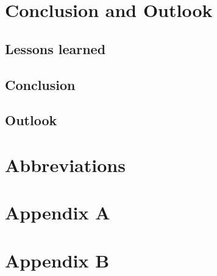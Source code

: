 \chapter{Conclusion and Outlook}\label{conclusion_outlook}
\section{Lessons learned}\label{lessons_learned}

\section{Conclusion}\label{conclusion}

\section{Outlook}\label{outlook}

\chapter{Abbreviations}

\printbibliography

\chapter{Appendix A}\label{appendix a}

\chapter{Appendix B}\label{appendix b}
%


